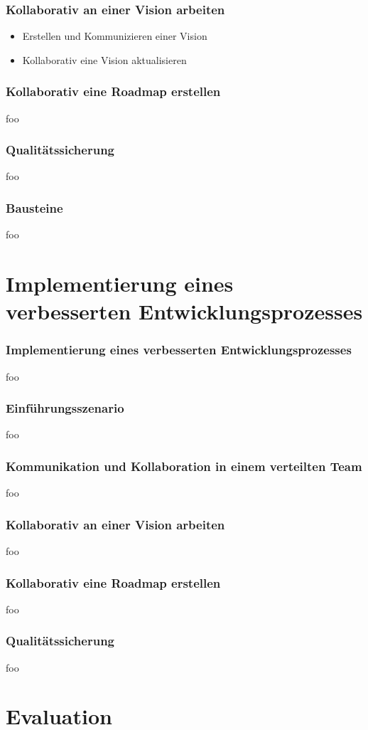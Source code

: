 \documentclass{beamer}
\begin{document}
\begin{frame}
\frametitle{Kollaborativ an einer Vision arbeiten}
\begin{itemize}
 \item Erstellen und Kommunizieren einer Vision
 \item Kollaborativ eine Vision aktualisieren
\end{itemize}
\end{frame}

\begin{frame}
\frametitle{Kollaborativ eine Roadmap erstellen}
foo
\end{frame}

\begin{frame}
\frametitle{Qualit\"atssicherung}
foo
\end{frame}

\begin{frame}
\frametitle{Bausteine}
foo
\end{frame}

\section{Implementierung eines verbesserten Entwicklungsprozesses}

\begin{frame}
\frametitle{Implementierung eines verbesserten Entwicklungsprozesses}
foo
\end{frame}

\begin{frame}
\frametitle{Einf\"uhrungsszenario}
foo
\end{frame}

\begin{frame}
\frametitle{Kommunikation und Kollaboration in einem verteilten Team}
foo
\end{frame}

\begin{frame}
\frametitle{Kollaborativ an einer Vision arbeiten}
foo
\end{frame}

\begin{frame}
\frametitle{Kollaborativ eine Roadmap erstellen}
foo
\end{frame}

\begin{frame}
\frametitle{Qualit\"atssicherung}
foo
\end{frame}

\section{Evaluation}
\end{document}
